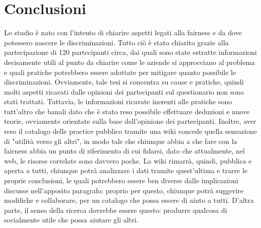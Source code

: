 \chapter{Conclusioni} %
%

Lo studio è nato con l'intento di chiarire aspetti legati alla fairness e da dove potessero nascere le discriminazioni. Tutto ciò è stato chiarito grazie alla partecipazione di 120 partecipanti circa, dai quali sono state estratte informazioni decisamente utili al punto da chiarire come le aziende si approcciano al problema e quali pratiche potrebbero essere adottate per mitigare quanto possibile le discriminazioni. Ovviamente, tale tesi si concentra su cause e pratiche, quindi molti aspetti ricavati dalle opinioni dei partecipanti sul questionario non sono stati trattati. Tuttavia, le informazioni ricavate inerenti alle pratiche sono tutt'altro che banali dato che è stato reso possibile effettuare deduzioni e nuove teorie, ovviamente orientate sulla base dell'opinione dei partecipanti. Inoltre, aver reso il catalogo delle practice pubblico tramite una wiki concede quella sensazione di "utilità verso gli altri", in modo tale che chiunque abbia a che fare con la fairness abbia un punto di riferimento di cui fidarsi, dato che attualmente, nel web, le risorse correlate sono davvero poche. La wiki rimarrà, quindi, pubblica e aperta a tutti, chiunque potrà analizzare i dati tramite quest'ultima e trarre le proprie conclusioni, le quali potrebbero essere ben diverse dalle implicazioni discusse nell'apposito paragrafo: proprio per questo, chiunque potrà suggerire modifiche e collaborare, per un catalogo che possa essere di aiuto a tutti. D'altra parte, il senso della ricerca dovrebbe essere questo: produrre qualcosa di socialmente utile che possa aiutare gli altri.

\newpage
